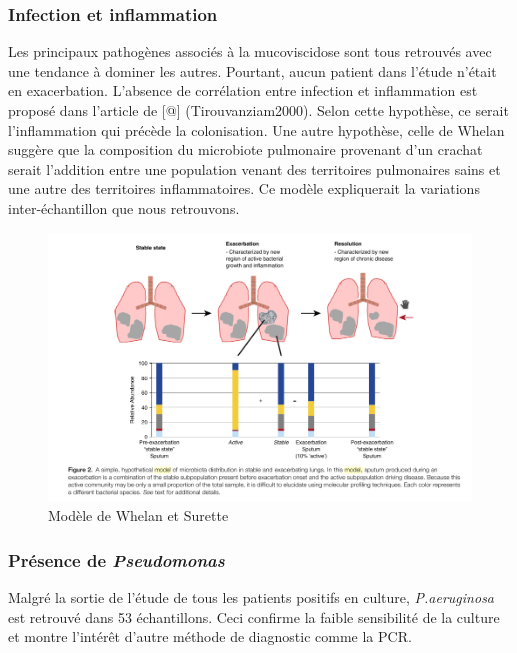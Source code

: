 \documentclass[12pt,a4paper]{article}
\begin{document}
\subsubsection{Infection et inflammation}
Les principaux pathogènes associés à la mucoviscidose sont tous retrouvés avec une tendance à dominer les autres. Pourtant, aucun patient dans l'étude n'était en exacerbation. L'absence de corrélation entre infection et inflammation est proposé dans l'article de [@] (Tirouvanziam2000). Selon cette hypothèse, ce serait l'inflammation qui précède la colonisation.  
Une autre hypothèse, celle de Whelan \cite{Whelan2015} suggère que la composition du microbiote pulmonaire provenant d'un crachat serait l'addition entre une population venant des territoires pulmonaires sains et une autre des territoires inflammatoires. Ce modèle expliquerait la variations inter-échantillon que nous retrouvons. 

\begin{figure}[h]
\begin{center}
\includegraphics[scale=0.60]{img/lung_region.png}\hfill
\end{center}
\caption{Modèle de Whelan et Surette \cite{Whelan2015}}
\label{lungregion}
\end{figure}

\subsubsection{Présence de \textit{Pseudomonas}}
Malgré la sortie de l’étude de tous les patients positifs en culture,  \textit{P.aeruginosa} est retrouvé dans 53 échantillons. Ceci confirme la faible sensibilité de la culture et montre l’intérêt d’autre méthode de diagnostic comme la PCR\cite{LeGall}.
\end{document}
